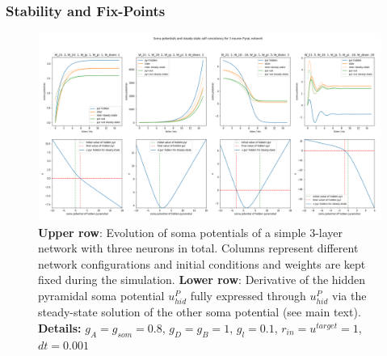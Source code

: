 \documentclass[12pt,a4paper]{article}
\begin{document}
\subsubsection{Stability and Fix-Points}
\begin{figure}[!ht]
  \centering
  \includegraphics[width=\linewidth]{img/stability.png}
  \caption{\textbf{Upper row}: Evolution of soma potentials of a simple 3-layer network with three neurons in total. Columns represent different network configurations and initial conditions and weights are kept fixed during the simulation. \textbf{Lower row}: Derivative of the hidden pyramidal soma potential $u^P_{hid}$ fully expressed through $u^P_{hid}$ via the steady-state solution of the other soma potential (see main text). \textbf{Details: } $g_A = g_{som} = 0.8$, $g_D = g_B = 1$, $g_l = 0.1$, $r_{in} = u^{target} = 1$, $dt = 0.001$}
  \label{fig:stability}
\end{figure}
\end{document}
